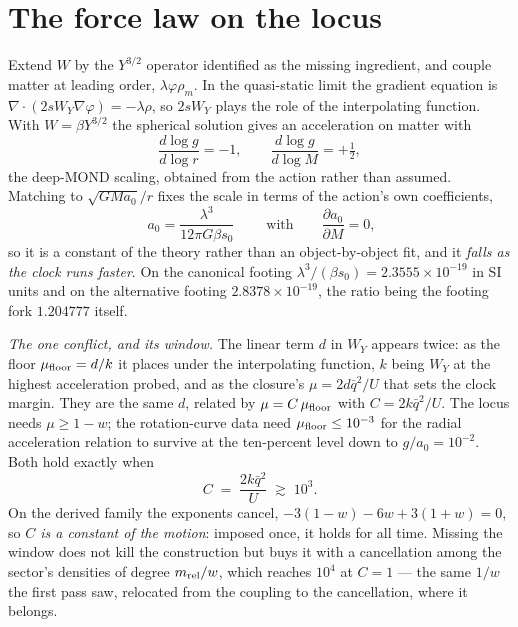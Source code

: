 \documentclass[11pt,letterpaper]{article}
\begin{document}
\section{The force law on the locus}
Extend $W$ by the $Y^{3/2}$ operator \cite{paper23} identified as the missing ingredient, and couple matter at leading order, $\lambda\varphi\rho_m$. In the quasi-static limit the gradient equation is $\nabla\!\cdot\!(2sW_Y\nabla\varphi)=-\lambda\rho$, so $2sW_Y$ plays the role of the interpolating function. With $W=\beta Y^{3/2}$ the spherical solution gives an acceleration on matter with
\begin{equation}
\frac{d\log g}{d\log r}=-1,\qquad \frac{d\log g}{d\log M}=+\tfrac12 ,
\end{equation}
the deep-MOND scaling, obtained from the action rather than assumed. Matching to $\sqrt{GMa_0}/r$ fixes the scale in terms of the action's own coefficients,
\begin{equation}
\boxed{\;a_0=\frac{\lambda^3}{12\pi G\beta s_0}\;}\qquad\text{with}\qquad \frac{\partial a_0}{\partial M}=0 ,
\end{equation}
so it is a constant of the theory rather than an object-by-object fit, and it \emph{falls as the clock runs faster}. On the canonical footing $\lambda^3/(\beta s_0)=2.3555\times10^{-19}$ in SI units and on the alternative footing $2.8378\times10^{-19}$, the ratio being the footing fork $1.204777$ itself.

\emph{The one conflict, and its window.} The linear term $d$ in $W_Y$ appears twice: as the floor $\mu_{\rm floor}=d/k$ it places under the interpolating function, $k$ being $W_Y$ at the highest acceleration probed, and as the closure's $\mu=2d\bar q^2/U$ that sets the clock margin. They are the same $d$, related by $\mu=C\,\mu_{\rm floor}$ with $C=2k\bar q^2/U$. The locus needs $\mu\ge1-w$; the rotation-curve data need $\mu_{\rm floor}\le10^{-3}$ for the radial acceleration relation to survive at the ten-percent level down to $g/a_0=10^{-2}$. Both hold exactly when
\begin{equation}
C\;=\;\frac{2k\bar q^2}{U}\;\gtrsim\;10^{3}.
\end{equation}
On the derived family the exponents cancel, $-3(1-w)-6w+3(1+w)=0$, so \emph{$C$ is a constant of the motion}: imposed once, it holds for all time. Missing the window does not kill the construction but buys it with a cancellation among the sector's densities of degree $m_{\rm rel}/w$, which reaches $10^4$ at $C=1$ --- the same $1/w$ the first pass saw, relocated from the coupling to the cancellation, where it belongs.
\end{document}
